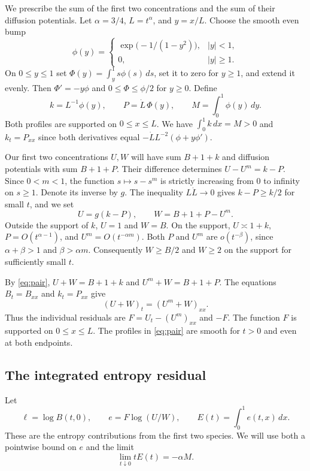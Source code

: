 \documentclass[11pt]{article}
\begin{document}
We prescribe the sum of the first two concentrations and the sum of their
diffusion potentials. Let \(\alpha=3/4\), \(L=t^\alpha\), and \(y=x/L\).
Choose the smooth even bump
\[
 \phi(y)=
 \begin{cases}
 \exp\!\bigl(-1/(1-y^2)\bigr),& |y|<1,\\
 0,& |y|\ge1 .
 \end{cases}
\]
On \(0\le y\le1\) set \(\Phi(y)=\int_y^1 s\phi(s)\,ds\), set it to zero
for \(y\ge1\), and extend it evenly. Then \(\Phi'=-y\phi\) and
\(0\le\Phi\le\phi/2\) for \(y\ge0\). Define
\begin{equation}
 k=L^{-1}\phi(y),\qquad P=\dot L\,\Phi(y),\qquad
 M=\int_0^1\phi(y)\,dy .
 \label{eq:spike}
\end{equation}
Both profiles are supported on \(0\le x\le L\).
We have \(\int_0^1 k\,dx=M>0\) and \(k_t=P_{xx}\) since both
derivatives equal \(-\dot L L^{-2}(\phi+y\phi')\).

Our first two concentrations \(U,W\) will have sum \(B+1+k\) and
diffusion potentials with sum \(B+1+P\). Their difference determines
\(U-U^m=k-P\). Since \(0<m<1\), the function \(s\mapsto s-s^m\)
is strictly increasing from \(0\) to infinity on \(s\ge1\). Denote
its inverse by \(g\). The inequality \(L\dot L\to0\) gives \(k-P\ge k/2\)
for small \(t\), and we set
\begin{equation}
 U=g(k-P),\qquad W=B+1+P-U^m .
 \label{eq:pair}
\end{equation}
Outside the support of \(k\), \(U=1\) and \(W=B\).
On the support, \(U\asymp 1+k\), \(P=O(t^{\alpha-1})\), and
\(U^m=O(t^{-\alpha m})\). Both \(P\) and \(U^m\) are \(o(t^{-\beta})\),
since \(\alpha+\beta>1\) and \(\beta>\alpha m\).
Consequently \(W\ge B/2\) and \(W\ge2\) on the support for sufficiently
small \(t\).

By \eqref{eq:pair}, \(U+W=B+1+k\) and \(U^m+W=B+1+P\).
The equations \(B_t=B_{xx}\) and \(k_t=P_{xx}\) give
\[
 (U+W)_t=(U^m+W)_{xx}.
\]
Thus the individual residuals are \(F=U_t-(U^m)_{xx}\) and \(-F\).
The function \(F\) is supported on \(0\le x\le L\).
The profiles in \eqref{eq:pair} are smooth for \(t>0\) and even at
both endpoints.

\subsection{The integrated entropy residual}

Let
\[
 \ell=\log B(t,0),\qquad e=F\log(U/W),\qquad E(t)=\int_0^1 e(t,x)\,dx .
\]
These are the entropy contributions from the first two species.
We will use both a pointwise bound on \(e\) and the limit
\begin{equation}
 \lim_{t\downarrow0}t E(t)=-\alpha M .
 \label{eq:E-limit}
\end{equation}
\end{document}
